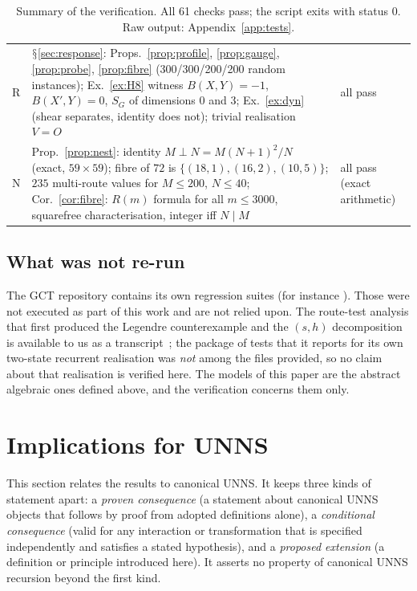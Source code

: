 \documentclass[11pt,a4paper]{article}
\renewcommand{\S}{\ensuremath{\mathsection}}
\theoremstyle{plain}
\theoremstyle{definition}
\begin{document}
\begin{table}[t]
\begin{tabularx}{\textwidth}{@{}l>{\raggedright\arraybackslash}X>{\raggedright\arraybackslash}p{}@{}}
R & \S\ref{sec:response}: Props.~\ref{prop:profile}, \ref{prop:gauge}, \ref{prop:probe}, \ref{prop:fibre} (300/300/200/200 random instances); Ex.~\ref{ex:H8} witness $B(X,Y)=-1$, $B(X',Y)=0$, $S_G$ of dimensions $0$ and $3$; Ex.~\ref{ex:dyn} (shear separates, identity does not); trivial realisation $V=O$ & all pass\\
N & Prop.~\ref{prop:nest}: identity $M\perp N=M(N+1)^2/N$ (exact, $59\times59$); fibre of $72$ is $\{(18,1),(16,2),(10,5)\}$; $235$ multi-route values for $M\le200$, $N\le40$; Cor.~\ref{cor:fibre}: $R(m)$ formula for all $m\le3000$, squarefree characterisation, integer iff $N\mid M$ & all pass (exact arithmetic)\\
\bottomrule
\end{tabularx}
\caption{Summary of the verification. All 61 checks pass; the script exits with status $0$. Raw output: Appendix~\ref{app:tests}.}\label{tab:checks}
\end{table}

\subsection{What was not re-run}
The GCT repository contains its own regression suites (for instance ). Those were not executed as part of this work and are not relied upon. The route-test analysis that first produced the Legendre counterexample and the $(s,h)$ decomposition is available to us as a transcript~\cite{G9}; the package of tests that it reports for its own two-state recurrent realisation was \emph{not} among the files provided, so no claim about that realisation is verified here. The models of this paper are the abstract algebraic ones defined above, and the verification concerns them only.

\section{Implications for UNNS}\label{sec:unns}
This section relates the results to canonical UNNS. It keeps three kinds of statement apart: a \emph{proven consequence} (a statement about canonical UNNS objects that follows by proof from adopted definitions alone), a \emph{conditional consequence} (valid for any interaction or transformation that is specified independently and satisfies a stated hypothesis), and a \emph{proposed extension} (a definition or principle introduced here). It asserts no property of canonical UNNS recursion beyond the first kind.
\end{document}

